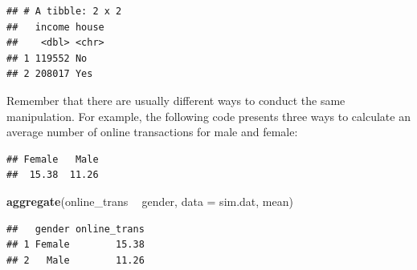 \documentclass[12pt,]{krantz}
\newenvironment{Shaded}{\begin{snugshade}}{\end{snugshade}}
\newcommand{\KeywordTok}[1]{\textcolor[rgb]{0.13,0.29,0.53}{\textbf{#1}}}
\newcommand{\DataTypeTok}[1]{\textcolor[rgb]{0.13,0.29,0.53}{#1}}
\newcommand{\DecValTok}[1]{\textcolor[rgb]{0.00,0.00,0.81}{#1}}
\newcommand{\StringTok}[1]{\textcolor[rgb]{0.31,0.60,0.02}{#1}}
\newcommand{\CommentTok}[1]{\textcolor[rgb]{0.56,0.35,0.01}{\textit{#1}}}
\newcommand{\OperatorTok}[1]{\textcolor[rgb]{0.81,0.36,0.00}{\textbf{#1}}}
\newcommand{\NormalTok}[1]{#1}
\theoremstyle{definition}
\theoremstyle{definition}
\theoremstyle{definition}
\theoremstyle{remark}
\begin{document}
\begin{Shaded}
\end{Shaded}

\begin{verbatim}
## # A tibble: 2 x 2
##   income house
##    <dbl> <chr>
## 1 119552 No   
## 2 208017 Yes
\end{verbatim}

Remember that there are usually different ways to conduct the same
manipulation. For example, the following code presents three ways to
calculate an average number of online transactions for male and female:

\begin{Shaded}
\end{Shaded}

\begin{verbatim}
## Female   Male 
##  15.38  11.26
\end{verbatim}

\begin{Shaded}
\begin{Highlighting}[]
\KeywordTok{aggregate}\NormalTok{(online_trans }\OperatorTok{~}\StringTok{ }\NormalTok{gender, }\DataTypeTok{data =}\NormalTok{ sim.dat, mean)}
\end{Highlighting}
\end{Shaded}

\begin{verbatim}
##   gender online_trans
## 1 Female        15.38
## 2   Male        11.26
\end{verbatim}

\begin{Shaded}
\end{Shaded}
\end{document}
